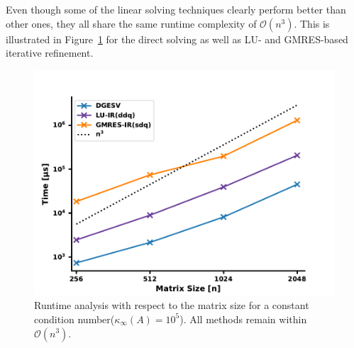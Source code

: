 \noindent Even though some of the linear solving techniques clearly perform better than other ones, they all share the same runtime complexity of $\mathcal{O}(n^3)$. This is illustrated in Figure~\hyperref[fig:ir3_scale]{\ref{fig:ir3_scale}} for the direct solving as well as LU- and GMRES-based iterative refinement. 

\begin{figure}[h]
    \centering
    \includegraphics[width=0.7\linewidth]{chapters/5_experiments/figures/IR3_scaling.pdf}
    \caption[IR - Scaling]{Runtime analysis with respect to the matrix size for a constant condition number($\kappa_\infty(A)=10^5$). All methods remain within $\mathcal{O}(n^3)$.}
    \label{fig:ir3_scale}
\end{figure}